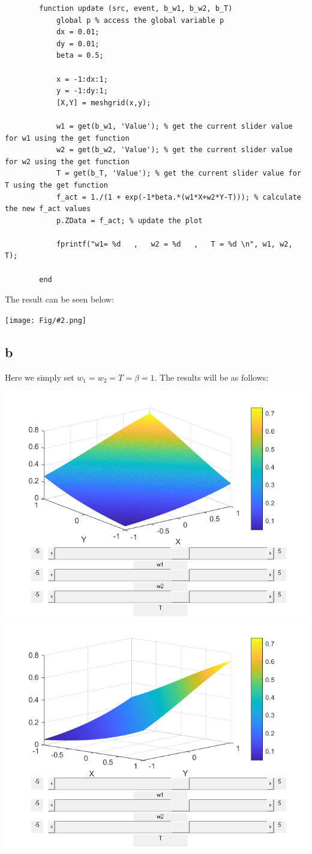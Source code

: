 \documentclass[]{article}
\newcommand{\pict}[2]{\begin{center}
		\texttt{[image: Fig/\#2.png]}
\end{center}}
\begin{document}
	\begin{lstlisting}
		function update (src, event, b_w1, b_w2, b_T)
			global p % access the global variable p
			dx = 0.01;
			dy = 0.01;
			beta = 0.5;
			
			x = -1:dx:1;
			y = -1:dy:1;
			[X,Y] = meshgrid(x,y);
			
			w1 = get(b_w1, 'Value'); % get the current slider value for w1 using the get function
			w2 = get(b_w2, 'Value'); % get the current slider value for w2 using the get function
			T = get(b_T, 'Value'); % get the current slider value for T using the get function
			f_act = 1./(1 + exp(-1*beta.*(w1*X+w2*Y-T))); % calculate the new f_act values
			p.ZData = f_act; % update the plot 
			
			fprintf("w1= %d   ,   w2 = %d   ,   T = %d \n", w1, w2, T);
			
		end
	\end{lstlisting}
	The result can be seen below:
	\pict{0.5}{Q1_F1}
	
	\subsection*{b}
	Here we simply set $w_1=w_2=T=\beta=1$. The results will be as follows:
	\begin{center}
		\includegraphics[width=0.4\linewidth]{Fig/Q1_F2.png}
		\qquad\qquad
		\includegraphics[width=0.4\linewidth]{Fig/Q1_F3.png}
	\end{center}
\end{document}
